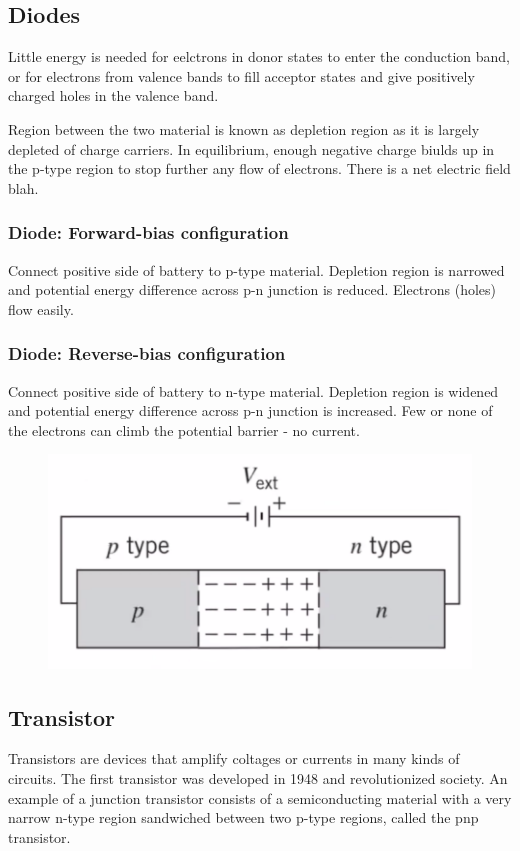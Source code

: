 \documentclass[class=article,crop=false]{standalone}
\begin{document}
\subsection{Diodes}
Little energy is needed for eelctrons in donor states to enter the conduction band, or for electrons from valence bands to fill acceptor states and give positively charged holes in the valence band.

Region between the two material is known as depletion region as it is largely depleted of charge carriers. In equilibrium, enough negative charge biulds up in the p-type region to stop further any flow of electrons. There is a net electric field blah.

\subsubsection{Diode: Forward-bias configuration}
Connect positive side of battery to p-type material. Depletion region is narrowed and potential energy difference across p-n junction is reduced. Electrons (holes) flow easily.

\subsubsection{Diode: Reverse-bias configuration}
Connect positive side of battery to n-type material. Depletion region is widened and potential energy difference across p-n junction is increased. Few or none of the electrons can climb the potential barrier - no current.

\begin{figure}[h!]
	\centering
	\includegraphics[width=.8\linewidth]{./Images/diode.png}
	\caption{}
\end{figure}

\subsection{Transistor}
Transistors are devices that amplify coltages or currents in many kinds of circuits. The first transistor was developed in 1948 and revolutionized society. An example of a junction transistor consists of a semiconducting material with a very narrow n-type region sandwiched between two p-type regions, called the pnp transistor.
\end{document}
